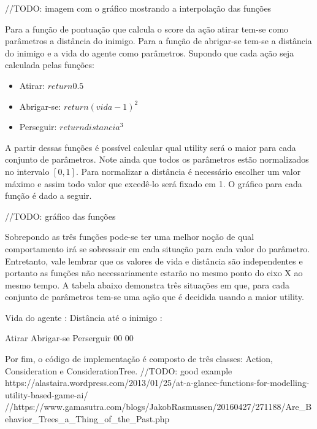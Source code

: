 \documentclass[12pt, 
openright, 
oneside, 
a4paper,    
brazil]{facom-ufu-abntex2}
\begin{document}
//TODO: imagem com o gráfico mostrando a interpolação das funções

Para a função de pontuação que calcula o score da ação atirar tem-se como parâmetros a distância do inimigo. Para a função de abrigar-se tem-se a distância do inimigo e a vida do agente como parâmetros. Supondo que cada ação seja calculada pelas funções:

\begin{itemize}
    \item Atirar: $return 0.5$
    \item Abrigar-se: $return (vida - 1)^2$
    \item Perseguir: $return distancia^3$
\end{itemize}

 A partir dessas funções é possível calcular qual utility será o maior para cada conjunto de parâmetros. Note ainda que todos os parâmetros estão normalizados no intervalo $[0,1]$. Para normalizar a distância é necessário escolher um valor máximo e assim todo valor que excedê-lo será fixado em 1. O gráfico para cada função é dado a seguir.
 
 //TODO: gráfico das funções
 
 Sobrepondo as três funções pode-se ter uma melhor noção de qual comportamento irá se sobressair em cada situação para cada valor do parâmetro. Entretanto, vale lembrar que os valores de vida e distância são independentes e portanto as funções não necessariamente estarão no mesmo ponto do eixo X ao mesmo tempo.
 A tabela abaixo demonstra três situações em que, para cada conjunto de parâmetros tem-se uma ação que é decidida usando a maior utility.
 
 Vida do agente				:
 Distância até o inimigo	:
 
 Atirar		Abrigar-se		Perserguir
 00			00

Por fim, o código de implementação é composto de três classes: Action, Consideration e ConsiderationTree.
//TODO: good example https://alastaira.wordpress.com/2013/01/25/at-a-glance-functions-for-modelling-utility-based-game-ai/
//https://www.gamasutra.com/blogs/JakobRasmussen/20160427/271188/Are_Behavior_Trees_a_Thing_of_the_Past.php

\end{document}
